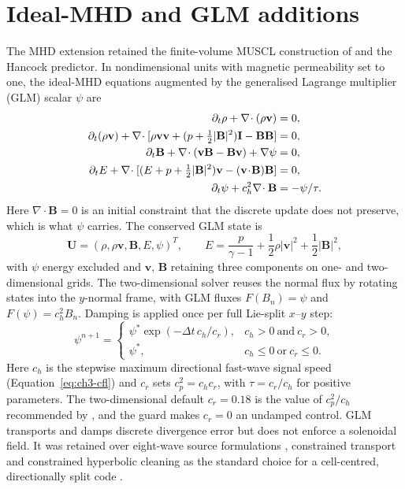 \section{Ideal-MHD and GLM additions}
\label{sec:ch2-mhd-glm}

The MHD extension retained the finite-volume MUSCL construction of
\citet{vanleer_1979} and the Hancock predictor. In nondimensional units
with magnetic permeability set to one, the ideal-MHD equations augmented by
the generalised Lagrange multiplier (GLM) scalar $\psi$ are
\begin{align}
 \partial_t\rho+\nabla\!\cdot(\rho\mathbf v)&=0, \notag\\
 \partial_t(\rho\mathbf v)+\nabla\!\cdot
 [\rho\mathbf v\mathbf v+(p+\tfrac12|\mathbf B|^2)\mathbf I
   -\mathbf B\mathbf B]&=0, \notag\\
 \partial_t\mathbf B+\nabla\!\cdot(\mathbf v\mathbf B-\mathbf B\mathbf v)
   +\nabla\psi&=0, \notag\\
 \partial_tE+\nabla\!\cdot[(E+p+\tfrac12|\mathbf B|^2)\mathbf v
   -(\mathbf v\!\cdot\!\mathbf B)\mathbf B]&=0, \notag\\
 \partial_t\psi+c_h^2\nabla\!\cdot\mathbf B&=-\psi/\tau.
 \label{eq:ch2-ideal-mhd}
\end{align}
Here $\nabla\!\cdot\mathbf B=0$ is an initial constraint that the discrete
update does not preserve, which is what $\psi$ carries. The conserved GLM state
is
\begin{equation}
 \mathbf{U}=(\rho,\rho\mathbf{v},\mathbf{B},E,\psi)^{T},\qquad
 E=\frac{p}{\gamma-1}+\frac{1}{2}\rho|\mathbf{v}|^{2}
   +\frac{1}{2}|\mathbf{B}|^{2},
 \label{eq:ch2-mhd-state}
\end{equation}
with $\psi$ energy excluded and $\mathbf v$, $\mathbf B$ retaining three
components on one- and two-dimensional grids. The two-dimensional solver reuses
the normal flux by rotating states into the $y$-normal frame, with GLM fluxes
$F(B_n)=\psi$ and $F(\psi)=c_h^2B_n$. Damping is applied once per full
Lie-split $x$--$y$ step:
\begin{equation}
 \psi^{n+1}=\begin{cases}
 \psi^{*}\exp(-\Delta t\,c_h/c_r),&c_h>0\ \text{and}\ c_r>0,\\
 \psi^{*},&c_h\leq0\ \text{or}\ c_r\leq0.
 \end{cases}
 \label{eq:ch2-glm-damping}
\end{equation}
Here $c_h$ is the stepwise maximum directional fast-wave signal speed
(Equation~\ref{eq:ch3-cfl}) and $c_r$ sets $c_p^2=c_hc_r$, with $\tau=c_r/c_h$
for positive parameters. The two-dimensional default $c_r=0.18$ is the value of
$c_p^2/c_h$ recommended by \citet{dedner_2002}, and the guard makes $c_r=0$ an
undamped control. GLM transports and damps discrete divergence error but does
not enforce a solenoidal field. It was retained over
eight-wave source formulations \citep{powell_1999}, constrained transport
\citep{evans_hawley_1988,balsaraSpicer1999ct,londrilloDelZanna2004uct,
gardinerStone2005ct} and constrained hyperbolic cleaning
\citep{triccoPrice2012divb} as the standard choice for a cell-centred,
directionally split code \citep{mignoneTzeferacos2010ctuGlm}.

